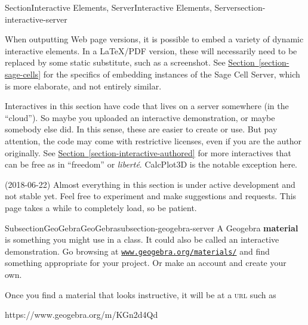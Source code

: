 \documentclass[twoside,10pt,]{article}
\newcommand{\xreffont}{\relax}
\newcommand{\initialism}[1]{\textsc{\MakeLowercase{#1}}}
\newcommand{\terminology}[1]{\textbf{#1}}
\numberwithin{equation}{section}
\begin{document}
\begin{sectionptx}{Section}{Interactive Elements, Server}{}{Interactive Elements, Server}{}{}{section-interactive-server}
%
%
\begin{introduction}{}%
When outputting Web page versions, it is possible to embed a variety of dynamic interactive elements.  In a \LaTeX{}\slash{}PDF version, these will necessarily need to be replaced by some static substitute, such as a screenshot.  See \hyperref[section-sage-cells]{Section~{\xreffont\ref{section-sage-cells}}} for the specifics of embedding instances of the Sage Cell Server, which is more elaborate, and not entirely similar.%
\par
Interactives in this section have code that lives on a server somewhere (in the ``cloud'').  So maybe you uploaded an interactive demonstration, or maybe somebody else did.  In this sense, these are easier to create or use.  But pay attention, the code may come with restrictive licenses, even if you are the author originally.  See \hyperref[section-interactive-authored]{Section~{\xreffont\ref{section-interactive-authored}}} for more interactives that can be free as in ``freedom'' or \textit{liberté}.  CalcPlot3D is the notable exception here.%
\par
(2018-06-22) Almost everything in this section is under active development and not stable yet.  Feel free to experiment and make suggestions and requests.  This page takes a while to completely load, so be patient.%
\end{introduction}%
%
%
\typeout{************************************************}
\typeout{************************************************}
%
\begin{subsectionptx}{Subsection}{GeoGebra}{}{GeoGebra}{}{}{subsection-geogebra-server}
%
%
A Geogebra \terminology{material} is something you might use in a class.  It could also be called an interactive demonstration.  Go browsing at \href{https://www.geogebra.org/materials/}{\nolinkurl{www.geogebra.org/materials/}} and find something appropriate for your project.  Or make an account and create your own.%
\par
Once you find a material that looks instructive, it will be at a \initialism{URL} such as%
\begin{codedisplay}
https://www.geogebra.org/m/KGn2d4Qd
\end{codedisplay}

\end{subsectionptx}
\end{sectionptx}
\end{document}
